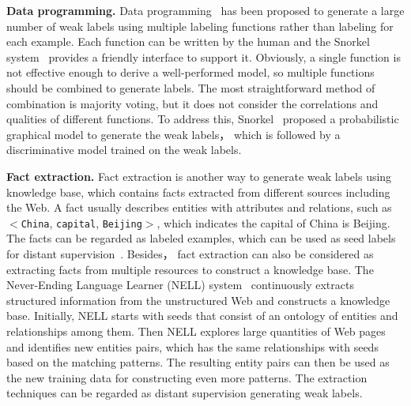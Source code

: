 \textbf{Data programming.}
Data programming~\cite{DBLP:conf/nips/RatnerSWSR16} has been proposed to generate a large number of weak labels using multiple  labeling functions rather than labeling for each example. Each function can be written by the human and the Snorkel system~\cite{DBLP:journals/vldb/RatnerBEFWR20} provides a friendly interface to support it. Obviously, a single function is not  effective enough to derive a well-performed model, so multiple functions should be combined to generate labels. The most straightforward method of combination is majority voting, but it does not consider the correlations and qualities of different functions. To address this, Snorkel~\cite{DBLP:journals/vldb/RatnerBEFWR20} proposed a probabilistic  graphical model to generate the weak labels， which is followed by a discriminative model trained on the weak labels.


\textbf{Fact extraction.}
Fact extraction is another way to generate weak labels using knowledge base, which contains facts  extracted from different sources including the Web. A fact usually describes entities with attributes and relations, such as $<$\texttt{China}, \texttt{capital}, \texttt{Beijing}$>$, which indicates the capital of China is Beijing. The facts can be regarded as labeled examples, which
can be used as seed labels for distant supervision~\cite{DBLP:conf/acl/MintzBSJ09}.  Besides，  fact extraction can also be considered as extracting facts from multiple resources to construct a knowledge base.
The Never-Ending Language Learner (NELL) system~\cite{DBLP:conf/aaai/MitchellCHTBCMG15} continuously extracts structured information from the unstructured Web and constructs a knowledge base. Initially, NELL starts with seeds that consist of an ontology of  entities   and relationships among them. Then NELL explores large quantities of Web pages and identifies new entities pairs, which has the same relationships with seeds based on the  matching patterns. The resulting entity pairs can then be used as the new training data for constructing even more patterns. The extraction techniques can be regarded as distant supervision generating weak labels.





\iffalse
\begin{figure}[h!]
	\centering
	\texttt{[image: figs/framework.pdf]}
	\caption{System Overview}
	\label{fig:framwork}
\end{figure}
\fi





